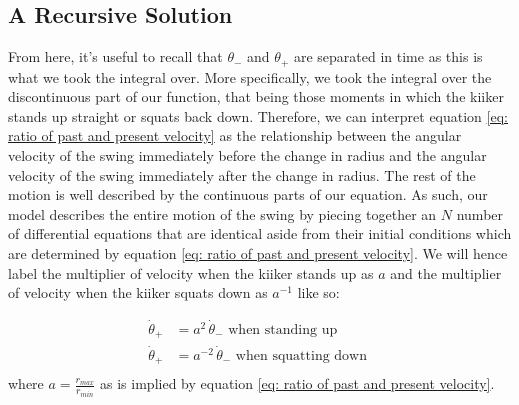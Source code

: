 \documentclass[12pt]{article}
\begin{document}
\subsection{A Recursive Solution}
From here, it's useful to recall that $\theta_-$ and $\theta_+$ are separated in time as this is what we took the integral over. More specifically, we took the integral over the discontinuous part of our function, that being those moments in which the kiiker stands up straight or squats back down. Therefore, we can interpret equation \ref{eq: ratio of past and present velocity} as the relationship between the angular velocity of the swing immediately before the change in radius and the angular velocity of the swing immediately after the change in radius. The rest of the motion is well described by the continuous parts of our equation. As such, our model describes the entire motion of the swing by piecing together an $N$ number of differential equations that are identical aside from their initial conditions which are determined by equation \ref{eq: ratio of past and present velocity}. We will hence label the multiplier of velocity  when the kiiker stands up as $a$ and the multiplier of velocity when the kiiker squats down as $a^{-1}$ like so: 

\begin{align}
    \dot{\theta}_+ &= a^2 \,\dot{\theta}_- \,\, \text{when standing up} \\
    \dot{\theta}_+ &= a^{-2} \,\dot{\theta}_- \,\,\text{when squatting down }\\
\end{align}
where $a = \frac{r_{max}}{r_{min}}$ as is implied by equation \ref{eq: ratio of past and present velocity}.\\
\end{document}
